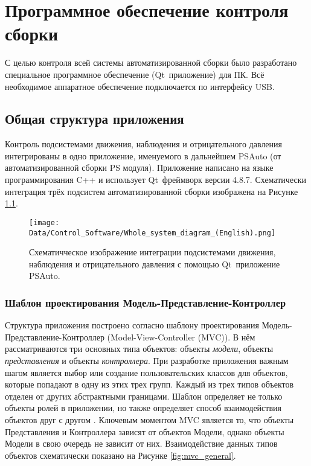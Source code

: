 \chapter{Программное обеспечение контроля сборки}

С целью контроля всей системы автоматизированной сборки было разработано специальное программное обеспечение (Qt~приложение) для ПК. Всё необходимое аппаратное обеспечение подключается по интерфейсу USB.

\section{Общая структура приложения}

Контроль подсистемами движения, наблюдения и отрицательного давления интегрированы в одно приложение, именуемого в дальнейшем PSAuto (от автоматизированной сборки PS модуля). Приложение написано на языке программирования C++ и использует Qt~фреймворк версии 4.8.7. Схематически интеграция трёх подсистем автоматизированной сборки изображена на Рисунке \ref{fig:general_app_structure}.

\begin{figure}[ht]\centering
\texttt{[image: Data/Control\_Software/Whole\_system\_diagram\_(English).png]}
\caption{Схематичческое изображение интеграции подсистемами движения, наблюдения и отрицательного давления с помощью Qt~приложение PSAuto.}
\label{fig:general_app_structure}
\end{figure}

\subsection{Шаблон проектирования Модель-Представление-Контроллер}

Структура приложения построено согласно шаблону проектирования Модель-Представление-Контроллер (Model-View-Controller (MVC)). В нём рассматриваются три основных типа объектов: объекты \emph{модели}, объекты \emph{представления} и объекты \emph{контроллера}. При разработке приложения важным шагом является выбор или создание пользовательских классов для объектов, которые попадают в одну из этих трех групп. Каждый из трех типов объектов отделен от других абстрактными границами. Шаблон определяет не только объекты ролей в приложении, но также определяет способ взаимодействия объектов друг с другом \cite{apple_MVC}. Ключевым моментом MVC является то, что объекты Представления и Контроллера зависят от объектов Модели, однако объекты Модели в свою очередь не зависит от них. Взаимодействие данных типов объектов схематически показано на Рисунке \ref{fig:mvc_general}.

